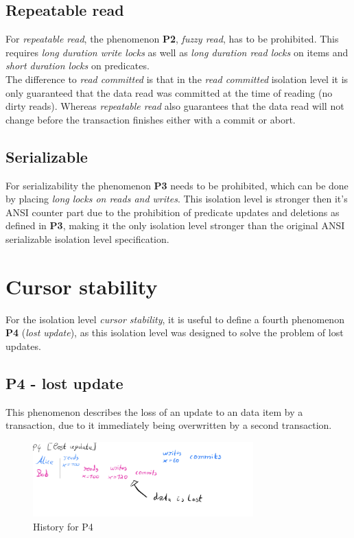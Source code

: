 \documentclass[sigconf, review=false]{acmart}
\begin{document}
\subsection{Repeatable read}
For \emph{repeatable read}, the phenomenon \textbf{P2}, \emph{fuzzy read}, has to be prohibited.
This requires \emph{long duration write locks} as well as \emph{long duration read locks} on
items and \emph{short duration locks} on predicates.\\
The difference to \emph{read committed} is that in the \emph{read committed} isolation level it is only guaranteed that
the data read was committed at the time of reading (no dirty reads). Whereas
\emph{repeatable read} also guarantees that the data read will not change before the
transaction finishes either with a commit or abort.

\subsection{Serializable}
For serializability the phenomenon \textbf{P3} needs to be prohibited, which can be done by placing \emph{long locks
    on reads and writes}. This isolation level is stronger then it's ANSI counter part due to the
prohibition of predicate updates and deletions as defined in \textbf{P3}, making it the only isolation level
stronger than the original ANSI serializable isolation level specification.

\section{Cursor stability}
For the isolation level \emph{cursor stability}, it is useful to define a fourth phenomenon \textbf{P4} (\emph{lost update}), as this isolation level
was designed to solve the problem of lost updates.
\subsection{ P4 - lost update}
This phenomenon describes the loss of an update to an data item by a transaction, due to it immediately being overwritten
by a second transaction.

\begin{figure}[h]
    \includegraphics[width=8.5cm]{P4}
    \caption{History for P4}
\end{figure}
\end{document}
